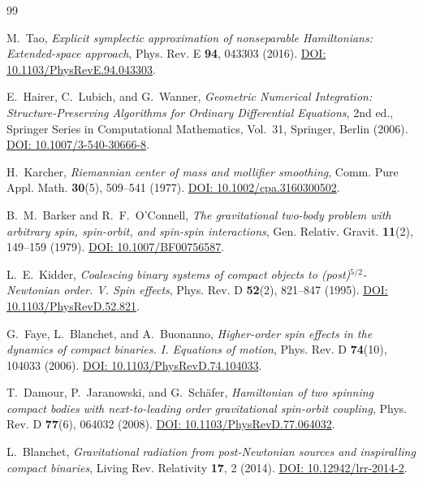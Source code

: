 \documentclass[11pt,a4paper,reqno]{article}
\theoremstyle{plain}
\theoremstyle{definition}
\theoremstyle{remark}
\numberwithin{equation}{section}
\begin{document}
\begin{thebibliography}{99}

M.~Tao, \textit{Explicit symplectic approximation of nonseparable Hamiltonians: Extended-space approach}, Phys. Rev. E \textbf{94}, 043303 (2016). \href{https://doi.org/10.1103/PhysRevE.94.043303}{DOI: 10.1103/PhysRevE.94.043303}.

E.~Hairer, C.~Lubich, and G.~Wanner, \textit{Geometric Numerical Integration: Structure-Preserving Algorithms for Ordinary Differential Equations}, 2nd ed., Springer Series in Computational Mathematics, Vol.~31, Springer, Berlin (2006). \href{https://doi.org/10.1007/3-540-30666-8}{DOI: 10.1007/3-540-30666-8}.

H.~Karcher, \textit{Riemannian center of mass and mollifier smoothing}, Comm. Pure Appl. Math. \textbf{30}(5), 509--541 (1977). \href{https://doi.org/10.1002/cpa.3160300502}{DOI: 10.1002/cpa.3160300502}.

B.~M.~Barker and R.~F.~O'Connell, \textit{The gravitational two-body problem with arbitrary spin, spin-orbit, and spin-spin interactions}, Gen. Relativ. Gravit. \textbf{11}(2), 149--159 (1979). \href{https://doi.org/10.1007/BF00756587}{DOI: 10.1007/BF00756587}.

L.~E.~Kidder, \textit{Coalescing binary systems of compact objects to (post)$^{5/2}$-Newtonian order. V. Spin effects}, Phys. Rev. D \textbf{52}(2), 821--847 (1995). \href{https://doi.org/10.1103/PhysRevD.52.821}{DOI: 10.1103/PhysRevD.52.821}.

G.~Faye, L.~Blanchet, and A.~Buonanno, \textit{Higher-order spin effects in the dynamics of compact binaries. I. Equations of motion}, Phys. Rev. D \textbf{74}(10), 104033 (2006). \href{https://doi.org/10.1103/PhysRevD.74.104033}{DOI: 10.1103/PhysRevD.74.104033}.

T.~Damour, P.~Jaranowski, and G.~Sch{\"a}fer, \textit{Hamiltonian of two spinning compact bodies with next-to-leading order gravitational spin-orbit coupling}, Phys. Rev. D \textbf{77}(6), 064032 (2008). \href{https://doi.org/10.1103/PhysRevD.77.064032}{DOI: 10.1103/PhysRevD.77.064032}.

L.~Blanchet, \textit{Gravitational radiation from post-Newtonian sources and inspiralling compact binaries}, Living Rev. Relativity \textbf{17}, 2 (2014). \href{https://doi.org/10.12942/lrr-2014-2}{DOI: 10.12942/lrr-2014-2}.


\end{thebibliography}
\end{document}
